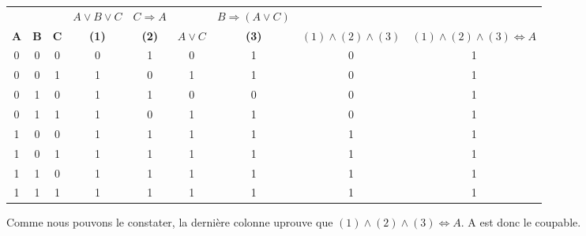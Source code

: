 \documentclass{report}
\begin{document}
\begin{center}
\begin{tabular}{|ccc||cccc||c||c|}
\hline
&  &  & $A \vee B \vee C$ & $C \Rightarrow A$ &  & $B \Rightarrow (A \vee C)$ &  & \\
\textbf{\textcolor{tcA}{$\textbf{A}$}} & \textbf{\textcolor{tcA}{$\textbf{B}$}} & \textbf{\textcolor{tcA}{$\textbf{C}$}} & \textbf{\textcolor{tcA}{(1)}} & \textbf{\textcolor{tcA}{(2)}} & \textbf{\textcolor{tcA}{$A \vee C$}} & \textbf{\textcolor{tcA}{(3)}} & \textbf{\textcolor{tcA}{$(1)\wedge(2)\wedge(3)$}} & \textbf{\textcolor{tcA}{$(1)\wedge(2)\wedge(3) \Leftrightarrow A $}}\\
\hline
0 & 0 & 0 & 0 & 1 & 0 & 1 & 0 & 1\\
0 & 0 & 1 & 1 & 0 & 1 & 1 & 0 & 1\\
0 & 1 & 0 & 1 & 1 & 0 & 0 & 0 & 1\\
0 & 1 & 1 & 1 & 0 & 1 & 1 & 0 & 1\\
1 & 0 & 0 & 1 & 1 & 1 & 1 & 1 & 1\\
1 & 0 & 1 & 1 & 1 & 1 & 1 & 1 & 1\\
1 & 1 & 0 & 1 & 1 & 1 & 1 & 1 & 1\\
1 & 1 & 1 & 1 & 1 & 1 & 1 & 1 & 1\\
\hline
\end{tabular}
\end{center}

  
Comme nous pouvons le constater, la derni\`{e}re colonne uprouve que $(1)\wedge(2)\wedge(3) \Leftrightarrow A $. A est donc le coupable.
 
 
 
 
\end{document}

